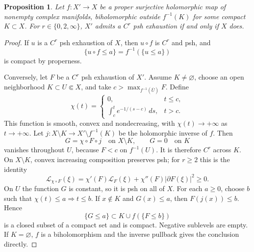 \documentclass[11pt]{amsart}
\newtheorem{proposition}[theorem]{Proposition}
\theoremstyle{definition}
\theoremstyle{remark}
\numberwithin{equation}{section}
\newcommand{\Levi}{\mathcal L}
\begin{document}
\begin{proposition}\label{prop:compact-modification}
Let $f:X'\to X$ be a proper surjective holomorphic map of nonempty
complex manifolds, biholomorphic outside $f^{-1}(K)$ for some compact
$K\subset X$. For $r\in\{0,2,\infty\}$, $X'$ admits a $C^r$ psh
exhaustion if and only if $X$ does.
\end{proposition}
\begin{proof}
If $u$ is a $C^r$ psh exhaustion of $X$, then $u\circ f$ is
$C^r$ and psh, and
\[
 \{u\circ f\le a\}=f^{-1}(\{u\le a\})
\]
is compact by properness.

Conversely, let $F$ be a $C^r$ psh exhaustion of $X'$.
Assume $K\ne\varnothing$, choose an open neighborhood
$K\subset U\Subset X$, and take
$c>\max_{f^{-1}(\overline U)}F$. Define
\[
 \chi(t)=
 \begin{cases}
  0,&t\le c,\\[2pt]
  \displaystyle\int_c^t e^{-1/(s-c)}\,ds,&t>c.
 \end{cases}
\]
This function is smooth, convex and nondecreasing, with
$\chi(t)\to+\infty$ as $t\to+\infty$.
Let $j:X\setminus K\to X'\setminus f^{-1}(K)$ be the
holomorphic inverse of $f$. Then
\[
 G=\chi\circ F\circ j\quad\text{on }X\setminus K,
 \qquad G=0\quad\text{on }K
\]
vanishes throughout $U$, because $F<c$ on $f^{-1}(U)$.
It is therefore $C^r$ across $K$. On $X\setminus K$, convex
increasing composition preserves psh; for $r\ge2$ this is the
identity
\[
 \Levi_{\chi\circ F}(\xi)
 =\chi'(F)\Levi_F(\xi)+\chi''(F)|\partial F(\xi)|^2\ge0.
\]
On $U$ the function $G$ is constant, so it is psh on all of $X$.
For each $a\ge0$, choose $b$ such that
$\chi(t)\le a\Rightarrow t\le b$. If $x\notin K$ and
$G(x)\le a$, then $F(j(x))\le b$. Hence
\[
 \{G\le a\}\subset K\cup f(\{F\le b\})
\]
is a closed subset of a compact set and is compact. Negative
sublevels are empty. If $K=\varnothing$, $f$ is a biholomorphism
and the inverse pullback gives the conclusion directly.
\end{proof}
\end{document}
